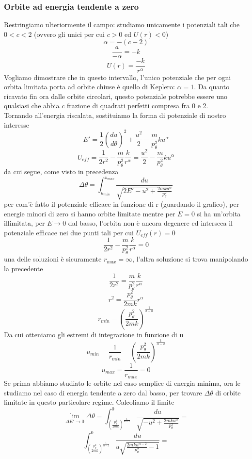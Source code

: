\documentclass[
10pt, %
a4paper, %
oneside, %
headinclude,footinclude, %
BCOR5mm, %
]{scrartcl}
\begin{document}
\subsubsection{Orbite ad energia tendente a zero}
Restringiamo ulteriormente il campo: studiamo
unicamente i potenziali tali che \(0<c<2\) (ovvero gli unici per cui \(c>0\) ed \(U(r)<0\))
\[\alpha = -(c-2)\]
\[\frac{a}{-\alpha} = -k\]
\[U(r) = \frac{-k}{r^\alpha}\]
Vogliamo dimostrare che in questo intervallo, l'unico potenziale che per ogni orbita limitata porta ad orbite chiuse è quello di Keplero: \(\alpha = 1\). Da quanto ricavato fin ora dalle orbite circolari, questo potenziale potrebbe essere uno qualsiasi che abbia \(c\) frazione di quadrati perfetti compresa fra 0 e 2.\\
Tornando all'energia riscalata, sostituiamo la forma di potenziale di nostro interesse
\[E' = \frac{1}{2}\left(\frac{du}{d\theta}\right)^2+\frac{u^2}{2}-\frac{m}{p_\theta^2}ku^\alpha\]
\[U_{eff} = \frac{1}{2r^2}-\frac{m}{p_\theta^2}\frac{k}{r^\alpha} =\frac{u^2}{2}-\frac{m}{p_\theta^2}ku^\alpha\]
da cui segue, come visto in precedenza
\[\Delta\theta = \int_{u_{min}}^{u_{max}}\frac{du}{\sqrt{2E'-u^2+\frac{2mku^\alpha}{p_\theta^2}}}\]
per com'è fatto il potenziale efficace in funzione di r (guardando il grafico), per energie minori di zero si hanno orbite limitate mentre per \(E=0\) si ha un'orbita illimitata, per \(E\rightarrow 0\) dal basso, l'orbita non è ancora degenere ed interseca il potenziale efficace nei due punti tali per cui \(U_{eff}(r) = 0\)
\[\frac{1}{2r^2}-\frac{m}{p_\theta^2}\frac{k}{r^\alpha} = 0\]
una delle soluzioni è sicuramente \(r_{max} = \infty\), l'altra soluzione si trova manipolando la precedente
\[\frac{1}{2r^2} = \frac{m}{p_\theta^2}\frac{k}{r^\alpha}\]
\[r^2 = \frac{p_\theta^2}{2mk}r^\alpha\]
\[r_{min} = \left(\frac{p_\theta^2}{2mk}\right)^{\frac{1}{2-\alpha}}\]
Da cui otteniamo gli estremi di integrazione in funzione di u
\[u_{min} =\frac{1}{r_{min}} = \left(\frac{p_\theta^2}{2mk}\right)^{\frac{1}{\alpha - 2}}\]
\[u_{max} = \frac{1}{r_{max}} = 0 \]
Se prima abbiamo studiato le orbite nel caso semplice di energia minima, ora le studiamo nel caso di energia tendente a zero dal basso, per trovare \(\Delta\theta\) di orbite limitate in questo particolare regime. Calcoliamo il limite
\[\lim_{\Delta E'\to 0}\Delta\theta = \int_{\left(\frac{p_\theta^2}{2mk}\right)^{\frac{1}{\alpha - 2}}}^{0}\frac{du}{\sqrt{-u^2+\frac{2mku^\alpha}{p_\theta^2}}}=\]
\[ \int_{\left(\frac{p_\theta^2}{2mk}\right)^{\frac{1}{\alpha - 2}}}^{0}\frac{du}{u\sqrt{\frac{2mku^{\alpha-2}}{p_\theta^2}-1}}= \]
\end{document}
